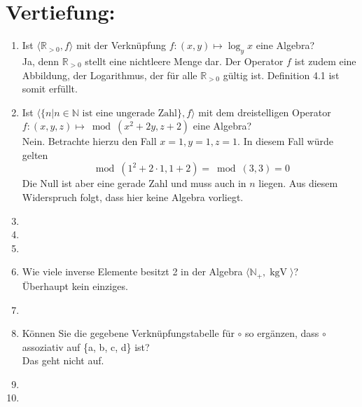 

\DeclareMathOperator{\kgV}{kgV}


    \maketitle
    \section*{Vertiefung:}
    \begin{enumerate}[label=(\alph*)]
        \item Ist $\langle \mathbb{R}_{>0} , f \rangle$ mit der Verknüpfung $f : (x,y) \mapsto  \log_y x$ eine Algebra? \\
        Ja, denn $\mathbb{R}_{>0}$ stellt eine nichtleere Menge dar. Der Operator $f$ ist zudem eine Abbildung, 
        der Logarithmus, der für alle $\mathbb{R}_{>0}$ gültig ist. Definition 4.1 ist somit erfüllt.
        
        \item Ist $\langle \{n| n \in \mathbb{N} \textrm{ ist eine ungerade Zahl} \}, f \rangle$ mit dem dreistelligen 
        Operator $f : (x,y,z) \mapsto \bmod(x^2 + 2y, z + 2)$ eine Algebra? \\
        Nein. Betrachte hierzu den Fall $x = 1, y = 1, z = 1$. In diesem Fall würde gelten 
        $$\bmod(1^2 + 2 \cdot 1, 1 + 2 ) = \bmod(3,3) = 0$$ Die Null ist aber eine gerade Zahl und muss auch 
        in $n$ liegen. Aus diesem Widerspruch folgt, dass hier keine Algebra vorliegt.
        
        \item
        
        \item 
        
        \item 
        
        \item Wie viele inverse Elemente besitzt 2 in der Algebra $\langle \mathbb{N}_+ , \kgV \rangle$?\\
        Überhaupt kein einziges.
        
        \item 
        
        \item Können Sie die gegebene Verknüpfungstabelle für $\circ$ so ergänzen, dass $\circ$ assoziativ 
        auf \{a, b, c, d\} ist?\\
        Das geht nicht auf.
        
        \item
        
        \item         
        
    \end{enumerate}
